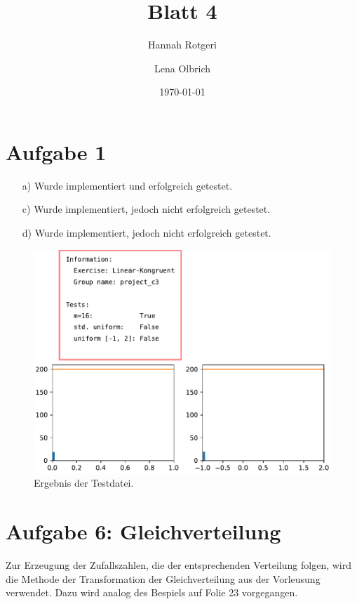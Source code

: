 \documentclass[11pt,a4paper]{article}
\title{Blatt 4}
\date{\today}
\author{Hannah Rotgeri \and Lena Olbrich}
\begin{document}
    \maketitle

    \section*{Aufgabe 1}

	\begin{itemize}
		\item[a)] Wurde implementiert und erfolgreich getestet.
		\item[c)] Wurde implementiert, jedoch nicht erfolgreich getestet.
		\item[d)] Wurde implementiert, jedoch nicht erfolgreich getestet.  
	\end{itemize}
 
	\begin{figure}[h]
		\centering
		\includegraphics[width=\textwidth]{lcg.pdf}
		\caption{Ergebnis der Testdatei.}
	\end{figure}

	
	\section*{Aufgabe 6: Gleichverteilung}
	
	Zur Erzeugung der Zufallszahlen, die der entsprechenden Verteilung folgen,
	wird die Methode der Transformation der Gleichverteilung aus der Vorleusung verwendet.
	Dazu wird analog des Bespiels auf Folie 23 vorgegangen.
\end{document}
